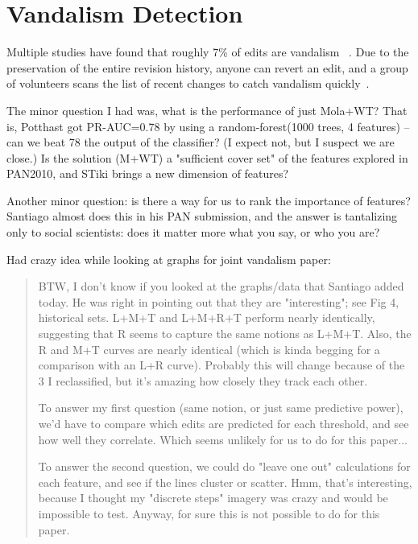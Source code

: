 \chapter{Vandalism Detection}
\label{ch:vandalism}

Multiple studies have found that roughly 7\% of edits are
vandalism~\cite{Potthast2008,Potthast2010a} .
Due to the preservation of the entire revision history,
anyone can revert an edit, and a group of volunteers scans the
list of recent changes to catch vandalism
quickly~\cite{wiki:RCPatrol}.







The minor question I had was, what is the performance of just Mola+WT?
That is, Potthast got PR-AUC=0.78 by using a random-forest(1000 trees,
4 features) -- can we beat 78%
the output of the classifier?  (I expect not, but I suspect we are
close.)  Is the solution (M+WT) a "sufficient cover set" of the
features explored in PAN2010, and STiki brings a new dimension of
features?

Another minor question: is there a way for us to rank the importance
of features?  Santiago almost does this in his PAN submission, and the
answer is tantalizing only to social scientists: does it matter more
what you say, or who you are?

Had crazy idea while looking at graphs for joint vandalism paper:
\begin{quote}
BTW, I don't know if you looked at the graphs/data that Santiago added today.  He was right in pointing out that they are "interesting"; see Fig 4, historical sets.  L+M+T and L+M+R+T perform nearly identically, suggesting that R seems to capture the same notions as L+M+T.  Also, the R and M+T curves are nearly identical (which is kinda begging for a comparison with an L+R curve).  Probably this will change because of the 3 I reclassified, but it's amazing how closely they track each other.

To answer my first question (same notion, or just same predictive power), we'd have to compare which edits are predicted for each threshold, and see how well they correlate.  Which seems unlikely for us to do for this paper...

To answer the second question, we could do "leave one out" calculations for each feature, and see if the lines cluster or scatter.  Hmm, that's interesting, because I thought my "discrete steps" imagery was crazy and would be impossible to test.  Anyway, for sure this is not possible to do for this paper.
\end{quote}


